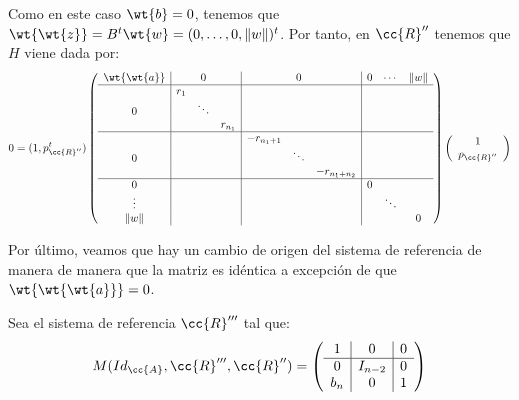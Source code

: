 \begin{enumerate}
    Como en este caso $\wt{b}=0$, tenemos que $\wt{\wt{z}} = B^t\wt{w} = (0,\dots, 0, \|w\|)^t$. Por tanto, en $\cc{R}''$ tenemos que $H$ viene dada por:
    \begin{equation*}
        0 = (1, p_{\cc{R}''}^t)\left(
        \begin{array}{c|ccc|ccc|ccc}
            \wt{\wt{a}} &&0&&&0&&0&\cdots&\|w\|   \\ \hline
            &r_1&&&&&&&& \\
            0&& \ddots&&&&&&&\\
            &&& r_{n_1}&&&&&&\\ \hline
            &&&& -r_{n_1+1}&&&&&\\
            0&&&&& \ddots&&&&\\
            &&&&&& -r_{n_1+n_2}&&&\\ \hline
            0&&&&&&& 0&&\\
            \vdots&&&&&&&& \ddots &\\
            \|w\|&&&&&&&&& 0
        \end{array}
        \right)\left(\begin{array}{c}
            1 \\ p_{\cc{R}''}
        \end{array}\right)
    \end{equation*}

    Por último, veamos que hay un cambio de origen del sistema de referencia de manera de manera que la matriz es idéntica a excepción de que $\wt{\wt{\wt{{a}}}}=0$.
    
    Sea el sistema de referencia $\cc{R}'''$ tal que:
    \begin{equation*}
        M(Id_{\cc{A}}, \cc{R}''', \cc{R}'') = \left(\begin{array}{c|c|c}
            1 & 0 & 0 \\ \hline
            0 & I_{n-2} & 0 \\
            b_n & 0 & 1
        \end{array}\right)
    \end{equation*}


\end{enumerate}
